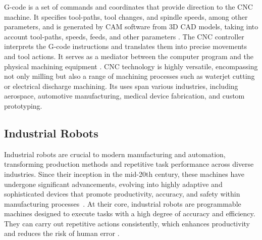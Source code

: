 \documentclass[ZLstudentexpose%
              ,optBiber%
              ,optEnglish%
              ,10pt
              ]{ZLlatex}%
\begin{document}
G-code \cite{DIN66025} is a set of commands and coordinates that provide direction to the CNC machine. It specifies tool-paths, tool changes, and spindle speeds, among other parameters, and is generated by CAM software from 3D CAD models, taking into account tool-paths, speeds, feeds, and other parameters \cite{cnckonw}.
The CNC controller interprets the G-code instructions and translates them into precise movements and tool actions. It serves as a mediator between the computer program and the physical machining equipment \cite{Adam.2022}. CNC technology is highly versatile, encompassing not only milling but also a range of machining processes such as waterjet cutting or electrical discharge machining. Its uses span various industries, including aerospace, automotive manufacturing, medical device fabrication, and custom prototyping.%
\subsection{Industrial Robots}
Industrial robots are crucial to modern manufacturing and automation, transforming production methods and repetitive task performance across diverse industries. Since their inception in the mid-20th century, these machines have undergone significant advancements, evolving into highly adaptive and sophisticated devices that promote productivity, accuracy, and safety within manufacturing processes~\cite{Ji.2019}.
At their core, industrial robots are programmable machines designed to execute tasks with a high degree of accuracy and efficiency. They can carry out repetitive actions consistently, which enhances productivity and reduces the risk of human error \cite{Siciliano.2016}. 
\end{document}
